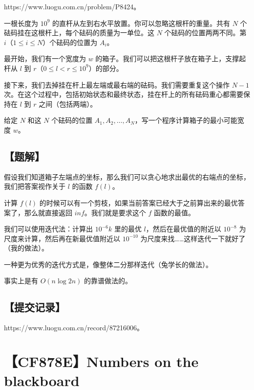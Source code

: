 \documentclass[UTF8,12pt,a4paper]{ctexart}
\begin{document}
	https://www.luogu.com.cn/problem/P8424。
	
	一根长度为 ${10}^9$ 的直杆从左到右水平放置。你可以忽略这根杆的重量。共有 $N$ 个砝码挂在这根杆上，每个砝码的质量为一单位。这 $N$ 个砝码的位置两两不同。第 $i$（$1 \le i \le N$）个砝码的位置为 $A_i$。
	
	最开始，我们有一个宽度为 $w$ 的箱子。我们可以把这根杆子放在箱子上，支撑起杆从 $l$ 到 $r$（$0 \le l < r \le {10}^9$）的部分。
	
	接下来，我们去掉挂在杆上最左端或最右端的砝码。我们需要重复这个操作 $N - 1$ 次。在这个过程中，包括初始状态和最终状态，挂在杆上的所有砝码重心都需要保持在 $l$ 到 $r$ 之间（包括两端）。
	
	给定 $N$ 和这 $N$ 个砝码的位置 $A_1, A_2, \ldots, A_N$，写一个程序计算箱子的最小可能宽度 $w$。
	
	\subsection*{【题解】}
	
	假设我们知道箱子左端点的坐标，那么我们可以贪心地求出最优的右端点的坐标，我们把答案视作关于 $l$ 的函数 $f(l)$。
	
	计算 $f(l)$ 的时候可以有一个剪枝，如果当前答案已经大于之前算出来的最优答案了，那么就直接返回 $inf$。我们就是要求这个 $f$ 函数的最值。
	
	我们可以使用迭代法：计算出 $10^{-6}k$ 里的最优 $l$，然后在最优值的附近以 $10^{-8}$ 为尺度来计算，然后再在新最优值附近以 $10^{-10}$ 为尺度来找……这样迭代一下就好了（我的做法）。
	
	一种更为优秀的迭代方式是，像整体二分那样迭代（兔学长的做法）。
	
	事实上是有 $O(n\log2n)$ 的靠谱做法的。
	
	\subsection*{【提交记录】}
	
	https://www.luogu.com.cn/record/87216006。
	
	
	\section*{【CF878E】Numbers on the blackboard}
	
\end{document}
